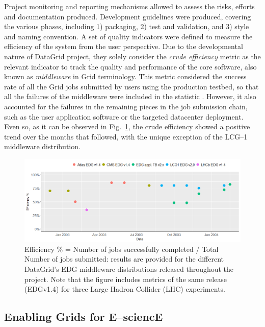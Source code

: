 Project monitoring and reporting mechanisms allowed to assess the risks, efforts and documentation
produced. Development guidelines \cite{datagridguide} were produced, covering the various phases, including
1) packaging, 2) test and validation, and 3) style and naming convention. A set of quality indicators
\cite{datagridindicators} were defined to measure the efficiency of the system from the user perspective. 
Due to the developmental nature of DataGrid project, they solely consider the \textit{crude efficiency} 
metric as the relevant indicator to track the quality and performance of the core software, also known as
\emph{middleware}
in Grid terminology. This metric considered the success rate of all the Grid jobs submitted by users using the 
production testbed, so that all the failures of the middleware were included in the statistic \cite{avellino2004datagrid}. However, it
also accounted for the failures in the remaining pieces in the job submission chain, such as the user application 
software or the targeted datacenter deployment. Even so, as it can be observed in Fig.~\ref{fig:efficiency}, 
the crude efficiency showed a positive trend over the months that followed, with the unique exception of the 
LCG--1 middleware distribution.
\begin{figure}[h]
\centering
\includegraphics[width=1\textwidth]{images/datagridEff.png}
\caption{Efficiency \% = Number of jobs successfully completed / Total Number of jobs submitted: results are 
provided for the different DataGrid's EDG middleware distributions released throughout the project. Note that the figure
includes metrics of the same release (EDGv1.4) for three Large Hadron Collider (LHC) experiments.}
\label{fig:efficiency}
\end{figure}

\subsection{Enabling Grids for E--sciencE}

